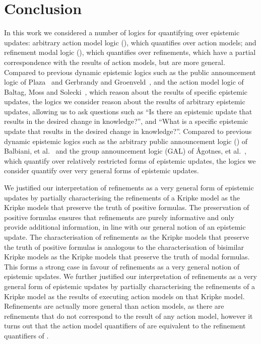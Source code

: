 \chapter{Conclusion}\label{conclusion}

In this work we considered a number of logics for quantifying over epistemic updates: 
arbitrary action model logic (\logicAaml{}), which quantifies over action models; and
refinement modal logic (\logicRml{}), which quantifies over refinements, which have a partial correspondence with the results of action models, but are more general.
Compared to previous dynamic epistemic logics such as the public announcement logic of Plaza~\cite{plaza:1989} and Gerbrandy and Groenveld~\cite{gerbrandy:1997}, and the action model logic of Baltag, Moss and Solecki~\cite{baltag:1998,baltag:2004}, which reason about the results of specific epistemic updates, the logics we consider reason about the results of arbitrary epistemic updates, allowing us to ask questions such as ``Is there an epistemic update that results in the desired change in knowledge?'', and ``What is a specific epistemic update that results in the desired change in knowledge?''.
Compared to previous dynamic epistemic logics such as the arbitrary public announcement logic (\logicApal{}) of Balbiani, et al.~\cite{balbiani:2007} and the group announcement logic (GAL) of {\AA}gotnes, et al.~\cite{agotnes:2008,agotnes:2010}, which quantify over relatively restricted forms of epistemic updates, the logics we consider quantify over very general forms of epistemic updates.

We justified our interpretation of refinements as a very general form of epistemic updates by partially characterising the refinements of a Kripke model as the Kripke models that preserve the truth of positive formulas.
The preservation of positive formulas ensures that refinements are purely informative and only provide additional information, in line with our general notion of an epistemic update.
The characterisation of refinements as the Kripke models that preserve the truth of positive formulas is analogous to the characterisation of bisimilar Kripke models as the Kripke models that preserve the truth of modal formulas.
This forms a strong case in favour of refinements as a very general notion of epistemic updates.
We further justified our interpretation of refinements as a very general form of epistemic updates by partially characterising the refinements of a Kripke model as the results of executing action models on that Kripke model.
Refinements are actually more general than action models, as there are refinements that do not correspond to the result of any action model, however it turns out that the action model quantifiers of \logicAaml{} are equivalent to the refinement quantifiers of \logicRml{}.

